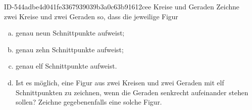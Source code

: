 \begin{exercise}
      {ID-544adbe4d041fe3367939039b3a0c63b91612cee}
      {Kreise und Geraden}
  \ifproblem\problem
    Zeichne zwei Kreise und zwei Geraden so, dass die jeweilige Figur
    \begin{enumerate}[a)]
      \item genau neun Schnittpunkte aufweist;
      \item genau zehn Schnittpunkte aufweist;
      \item genau elf Schnittpunkte aufweist.
      \item Ist es möglich, eine Figur aus zwei Kreisen und zwei Geraden mit elf
            Schnittpunkten zu zeichnen, wenn die Geraden senkrecht aufeinander
            stehen sollen? Zeichne gegebenenfalls eine solche Figur.
    \end{enumerate}
  \fi
\end{exercise}
